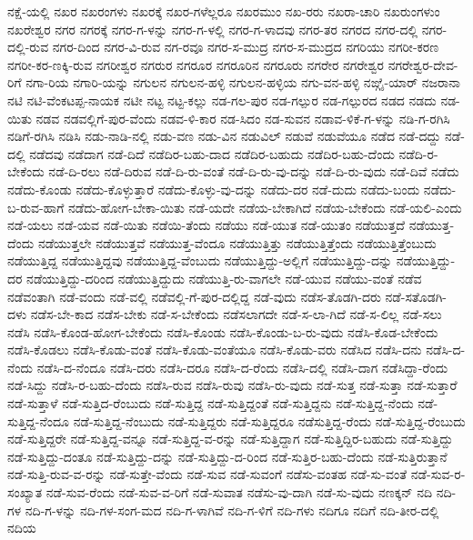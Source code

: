 ನಕ್ಷೆ-ಯಲ್ಲಿ
ನಖರ
ನಖರಂಗಳು
ನಖರಕ್ಕೆ
ನಖರ-ಗಳೆಲ್ಲರೂ
ನಖರಮುಂ
ನಖ-ರರು
ನಖರಾ-ಚಾರಿ
ನಖರುಂಗಳುಂ
ನಖರೇಶ್ವರ
ನಗರ
ನಗರಕ್ಕೆ
ನಗರ-ಗ-ಳನ್ನು
ನಗರ-ಗ-ಳಲ್ಲಿ
ನಗರ-ಗ-ಳಾದವು
ನಗರ-ತರ
ನಗರದ
ನಗರ-ದಲ್ಲಿ
ನಗರ-ದಲ್ಲಿ-ರುವ
ನಗರ-ದಿಂದ
ನಗರ-ವಿ-ರುವ
ನಗ-ರವೂ
ನಗರ-ಸ-ಮುದ್ರ
ನಗರ-ಸ-ಮುದ್ರದ
ನಗರಿಯು
ನಗರೀ-ಕರಣ
ನಗರೀ-ಕರ-ಣಕ್ಕಿ-ರುವ
ನಗರೀಶ್ವರ
ನಗರುರ
ನಗರೂರ
ನಗರೂರಿನ
ನಗರೂರು
ನಗರೇರ
ನಗರೇಶ್ವರ
ನಗರೇಶ್ವರ-ದೇವ-ರಿಗೆ
ನಗಾ-ರಿಯ
ನಗಾರಿ-ಯನ್ನು
ನಗುಲನ
ನಗುಲನ-ಹಳ್ಳಿ
ನಗುಲನ-ಹಳ್ಳಿಯ
ನಗು-ವನ-ಹಳ್ಳಿ
ನಙ್ಗೈ-ಯಾರ್
ನಜರಾನಾ
ನಟಿ
ನಟಿ-ವೆಂಕಟಪ್ಪ-ನಾಯಕ
ನಟೀ
ನಟ್ಟ
ನಟ್ಟ-ಕಲ್ಲು
ನಡ-ಗಲ-ಪುರ
ನಡ-ಗಲ್ಪುರ
ನಡ-ಗಲ್ಪುರದ
ನಡದ
ನಡದು
ನಡ-ಯಿತು
ನಡವ
ನಡವಲ್ಲಿಗೆ-ಪುರ-ವೆಂದು
ನಡವ-ಳಿ-ಕಾರ
ನಡ-ಸಿದಂ
ನಡ-ಸುವನ
ನಡಾವ-ಳಿಕೆ-ಗ-ಳನ್ನು
ನಡಿ-ಗ-ರಗಿಸಿ
ನಡಿಗೆ-ರಗಿಸಿ
ನಡಿಸಿ
ನಡು-ನಾಡಿ-ನಲ್ಲಿ
ನಡು-ವಣ
ನಡು-ವಿನ
ನಡುವಿಲ್
ನಡುವೆ
ನಡುವೆಯೂ
ನಡೆದ
ನಡೆ-ದದ್ದು
ನಡೆ-ದಲ್ಲಿ
ನಡೆದವು
ನಡೆದಾಗ
ನಡೆ-ದಿದೆ
ನಡೆದಿರ-ಬಹು-ದಾದ
ನಡೆದಿರ-ಬಹುದು
ನಡೆದಿರ-ಬಹು-ದೆಂದು
ನಡೆದಿ-ರ-ಬೇಕೆಂದು
ನಡೆ-ದಿ-ರಲು
ನಡೆ-ದಿರುವ
ನಡೆ-ದಿ-ರು-ವಂತೆ
ನಡೆ-ದಿ-ರು-ವು-ದನ್ನು
ನಡೆ-ದಿ-ರು-ವುದು
ನಡೆ-ದಿವೆ
ನಡೆದು
ನಡೆದು-ಕೊಂಡು
ನಡೆದು-ಕೊಳ್ಳುತ್ತಾರೆ
ನಡೆದು-ಕೊಳ್ಳು-ವು-ದನ್ನು
ನಡೆದು-ದರ
ನಡೆ-ದುದು
ನಡೆದು-ಬಂದು
ನಡೆದು-ಬ-ರುವ-ಹಾಗೆ
ನಡೆದು-ಹೋಗ-ಬೇಕಾ-ಯಿತು
ನಡೆ-ಯದೇ
ನಡೆಯ-ಬೇಕಾಗಿದೆ
ನಡೆಯ-ಬೇಕೆಂದು
ನಡೆ-ಯಲಿ-ಎಂದು
ನಡೆ-ಯಲು
ನಡೆ-ಯವ
ನಡೆ-ಯಿತು
ನಡೆಯಿ-ತೆಂದು
ನಡೆಯು
ನಡೆ-ಯುತ
ನಡೆ-ಯುತಂ
ನಡೆಯುತ್ತದೆ
ನಡೆಯುತ್ತ-ದೆಂದು
ನಡೆಯುತ್ತಲೇ
ನಡೆಯುತ್ತವೆ
ನಡೆಯುತ್ತ-ವೆಂದೂ
ನಡೆಯುತ್ತಿತ್ತು
ನಡೆಯುತ್ತಿತ್ತೆಂದು
ನಡೆಯುತ್ತಿತ್ತೆಂಬುದು
ನಡೆಯುತ್ತಿದ್ದ
ನಡೆಯುತ್ತಿದ್ದವು
ನಡೆಯುತ್ತಿದ್ದ-ವೆಂಬುದು
ನಡೆಯುತ್ತಿದ್ದು-ಅಲ್ಲಿಗೆ
ನಡೆಯುತ್ತಿದ್ದು-ದನ್ನು
ನಡೆಯುತ್ತಿದ್ದು-ದರ
ನಡೆಯುತ್ತಿದ್ದು-ದರಿಂದ
ನಡೆಯುತ್ತಿದ್ದುದು
ನಡೆಯುತ್ತಿ-ರು-ವಾಗಲೇ
ನಡೆ-ಯುವ
ನಡೆಯು-ವಂತೆ
ನಡೆವ
ನಡೆವಂತಾಗಿ
ನಡೆ-ವಂದು
ನಡೆ-ವಲ್ಲಿ
ನಡೆವಲ್ಲಿ-ಗೆ-ಪುರ-ದಲ್ಲಿದ್ದ
ನಡೆ-ವುದು
ನಡೆಸ-ತೊಡಗಿ-ದರು
ನಡೆ-ಸತೊಡಗಿ-ದಳು
ನಡೆಸ-ಬೇ-ಕಾದ
ನಡೆಸ-ಬೇಕು
ನಡೆ-ಸ-ಬೇಕೆಂದು
ನಡೆಸಲಾಗದೇ
ನಡೆ-ಸ-ಲಾ-ಗಿದೆ
ನಡೆ-ಸ-ಲಿಲ್ಲ
ನಡೆ-ಸಲು
ನಡೆಸಿ
ನಡೆಸಿ-ಕೊಂಡ-ಹೋಗ-ಬೇಕೆಂದು
ನಡೆಸಿ-ಕೊಂಡು
ನಡೆಸಿ-ಕೊಂಡು-ಬ-ರು-ವುದು
ನಡೆಸಿ-ಕೊಡ-ಬೇಕೆಂದು
ನಡೆಸಿ-ಕೊಡಲು
ನಡೆಸಿ-ಕೊಡು-ವಂತೆ
ನಡೆಸಿ-ಕೊಡು-ವಂತೆಯೂ
ನಡೆಸಿ-ಕೊಡು-ವರು
ನಡೆಸಿದ
ನಡೆಸಿ-ದನು
ನಡೆಸಿ-ದ-ನೆಂದು
ನಡೆಸಿ-ದ-ನೆಂದೂ
ನಡೆಸಿ-ದರು
ನಡೆಸಿ-ದರೂ
ನಡೆಸಿ-ದ-ರೆಂದು
ನಡೆಸಿ-ದಲ್ಲಿ
ನಡೆಸಿ-ದಾಗ
ನಡೆಸಿದ್ದಾ-ರೆಂದು
ನಡೆ-ಸಿದ್ದು
ನಡೆಸಿ-ರ-ಬಹು-ದೆಂದು
ನಡೆಸಿ-ರುವ
ನಡೆಸಿ-ರುವು
ನಡೆಸಿ-ರು-ವುದು
ನಡೆ-ಸುತ್ತ
ನಡೆ-ಸುತ್ತಾ
ನಡೆ-ಸುತ್ತಾರೆ
ನಡೆ-ಸುತ್ತಾಳೆ
ನಡೆ-ಸುತ್ತಿದ-ರೆಂಬುದು
ನಡೆ-ಸುತ್ತಿದ್ದ
ನಡೆ-ಸುತ್ತಿದ್ದಂತೆ
ನಡೆ-ಸುತ್ತಿದ್ದನು
ನಡೆ-ಸುತ್ತಿದ್ದ-ನೆಂದು
ನಡೆ-ಸುತ್ತಿದ್ದ-ನೆಂದೂ
ನಡೆ-ಸುತ್ತಿದ್ದ-ನೆಂಬುದು
ನಡೆ-ಸುತ್ತಿದ್ದರು
ನಡೆ-ಸುತ್ತಿದ್ದರೂ
ನಡೆಸುತ್ತಿದ್ದ-ರೆಂದು
ನಡೆ-ಸುತ್ತಿದ್ದ-ರೆಂಬುದು
ನಡೆ-ಸುತ್ತಿದ್ದರೇ
ನಡೆ-ಸುತ್ತಿದ್ದ-ವನ್ನೂ
ನಡೆ-ಸುತ್ತಿದ್ದ-ವ-ರನ್ನು
ನಡೆ-ಸುತ್ತಿದ್ದಾಗ
ನಡೆ-ಸುತ್ತಿದ್ದಿರ-ಬಹುದು
ನಡೆ-ಸುತ್ತಿದ್ದು
ನಡೆ-ಸುತ್ತಿದ್ದು-ದಂತೂ
ನಡೆ-ಸುತ್ತಿದ್ದು-ದನ್ನು
ನಡೆ-ಸುತ್ತಿದ್ದು-ದ-ರಿಂದ
ನಡೆ-ಸುತ್ತಿರ-ಬಹು-ದೆಂದು
ನಡೆ-ಸುತ್ತಿರುತ್ತಾನೆ
ನಡೆ-ಸುತ್ತಿ-ರುವ-ವ-ರನ್ನು
ನಡೆ-ಸುತ್ತೇ-ವೆಂದು
ನಡೆ-ಸುವ
ನಡೆ-ಸುವಂಗೆ
ನಡೆಸು-ವಂತಹ
ನಡೆ-ಸು-ವಂತೆ
ನಡೆ-ಸುವ-ರ-ಸಂಖ್ಯಾತ
ನಡೆ-ಸುವ-ರೆಂದು
ನಡೆ-ಸುವ-ವ-ರಿಗೆ
ನಡೆ-ಸುವಾತ
ನಡೆಸು-ವು-ದಾಗಿ
ನಡೆ-ಸು-ವುದು
ನಣಕ್ಕನ್
ನದಿ
ನದಿ-ಗಳ
ನದಿ-ಗ-ಳನ್ನು
ನದಿ-ಗಳ-ಸಂಗ-ಮದ
ನದಿ-ಗ-ಳಾಗಿವೆ
ನದಿ-ಗ-ಳಿಗೆ
ನದಿ-ಗಳು
ನದಿಗೂ
ನದಿಗೆ
ನದಿ-ತೀರ-ದಲ್ಲಿ
ನದಿಯ
